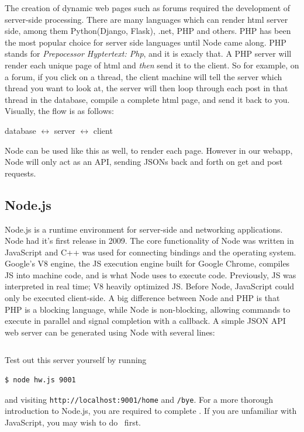 The creation of dynamic web pages such as forums required the development of
server-side processing. There are many languages which can render html server
side, among them Python(Django, Flask), .net, PHP and others. PHP has been the
most popular choice for server side languages until Node came along. PHP stands
for \textit{Prepocessor Hyptertext: Php}, and it is exacly that. A PHP server
will render each unique page of html and \textit{then} send it to the client. So
for example, on a forum, if you click on a thread, the client machine will tell
the server which thread you want to look at, the server will then loop through
each post in that thread in the database, compile a complete html page, and send
it back to you. Visually, the flow is as follows:

\begin{center}
database $\leftrightarrow$ server $\leftrightarrow$ client
\end{center}

Node can be used like this as well, to render each page. However in our webapp,
Node will only act as an API, sending JSONs back and forth on get and post 
requests. 

\subsection{Node.js}

Node.js is a runtime environment for server-side and networking applications.
Node had it's first release in 2009. The core functionality of Node was written
in JavaScript and C++ was used for connecting bindings and the operating system.
Google's V8 engine, the JS execution engine built for Google Chrome, compiles JS
into machine code, and is what Node uses to execute code. Previously, JS was
interpreted in real time; V8 heavily optimized JS.  Before Node, JavaScript
could only be executed client-side. A big difference between Node and PHP is
that PHP is a blocking language, while Node is non-blocking, allowing commands
to execute in parallel and signal completion with a callback.  A simple JSON API
web server can be generated using Node with several lines:

\inputminted{js}{files/nodejs/hw.js}

Test out this server yourself by running

\begin{verbatim}
$ node hw.js 9001
\end{verbatim}

and visiting \texttt{http://localhost:9001/home} and  \texttt{/bye}. For a more
thorough introduction to Node.js, you are required to complete \learnyounode.
If you are unfamiliar with JavaScript, you may wish to do \javascripting\ first.

